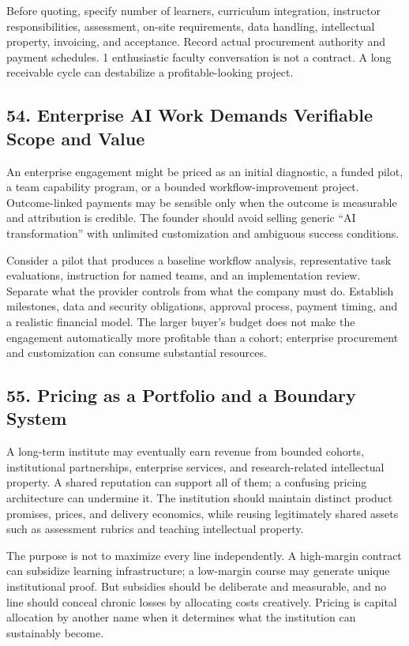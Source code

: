 Before quoting, specify number of learners, curriculum integration, instructor responsibilities, assessment, on-site requirements, data handling, intellectual property, invoicing, and acceptance. Record actual procurement authority and payment schedules. 1 enthusiastic faculty conversation is not a contract. A long receivable cycle can destabilize a profitable-looking project.

\subsection*{54. Enterprise AI Work Demands Verifiable Scope and Value}

An enterprise engagement might be priced as an initial diagnostic, a funded pilot, a team capability program, or a bounded workflow-improvement project. Outcome-linked payments may be sensible only when the outcome is measurable and attribution is credible. The founder should avoid selling generic ``AI transformation'' with unlimited customization and ambiguous success conditions.

Consider a pilot that produces a baseline workflow analysis, representative task evaluations, instruction for named teams, and an implementation review. Separate what the provider controls from what the company must do. Establish milestones, data and security obligations, approval process, payment timing, and a realistic financial model. The larger buyer's budget does not make the engagement automatically more profitable than a cohort; enterprise procurement and customization can consume substantial resources.

\subsection*{55. Pricing as a Portfolio and a Boundary System}

A long-term institute may eventually earn revenue from bounded cohorts, institutional partnerships, enterprise services, and research-related intellectual property. A shared reputation can support all of them; a confusing pricing architecture can undermine it. The institution should maintain distinct product promises, prices, and delivery economics, while reusing legitimately shared assets such as assessment rubrics and teaching intellectual property.

The purpose is not to maximize every line independently. A high-margin contract can subsidize learning infrastructure; a low-margin course may generate unique institutional proof. But subsidies should be deliberate and measurable, and no line should conceal chronic losses by allocating costs creatively. Pricing is capital allocation by another name when it determines what the institution can sustainably become.
